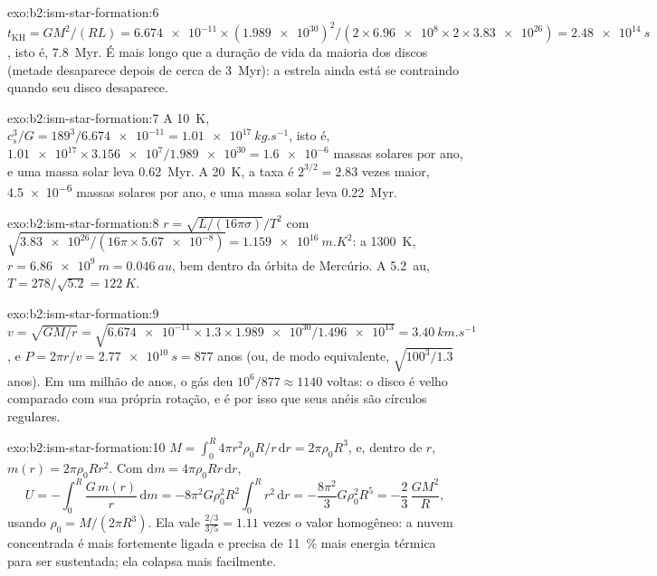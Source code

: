 \begin{solution}{exo:b2:ism-star-formation:6}
$t_{\mathrm{KH}} = GM^2/(RL) = \num{6.674e-11}\times(\num{1.989e30})^2/(2\times
\num{6.96e8}\times2\times\num{3.83e26}) = \qty{2.48e14}{s}$, isto é,
\qty{7.8}{Myr}. É mais longo que a duração de vida da maioria dos discos (metade desaparece depois de
cerca de \qty{3}{Myr}): a estrela ainda está se contraindo quando seu disco desaparece.
\end{solution}

\begin{solution}{exo:b2:ism-star-formation:7}
A \qty{10}{K}, $c_s^3/G = 189^3/\num{6.674e-11} = \qty{1.01e17}{kg.s^{-1}}$, isto é,
$\num{1.01e17}\times\num{3.156e7}/\num{1.989e30} = \num{1.6e-6}$ massas solares por
ano, e uma massa solar leva \qty{0.62}{Myr}. A \qty{20}{K}, a taxa é
$2^{3/2} = 2.83$ vezes maior, \num{4.5e-6} massas solares por ano, e uma massa
solar leva \qty{0.22}{Myr}.
\end{solution}

\begin{solution}{exo:b2:ism-star-formation:8}
$r = \sqrt{L/(16\pi\sigma)}/T^2$ com $\sqrt{\num{3.83e26}/(16\pi\times\num{5.67e-8})}
= \qty{1.159e16}{m.K^2}$: a \qty{1300}{K}, $r = \qty{6.86e9}{m} = \qty{0.046}{au}$,
bem dentro da órbita de Mercúrio. A \qty{5.2}{au}, $T = 278/\sqrt{5.2} = \qty{122}{K}$.
\end{solution}

\begin{solution}{exo:b2:ism-star-formation:9}
$v = \sqrt{GM/r} = \sqrt{\num{6.674e-11}\times1.3\times\num{1.989e30}/\num{1.496e13}}
= \qty{3.40}{km.s^{-1}}$, e $P = 2\pi r/v = \qty{2.77e10}{s} = 877$ anos
(ou, de modo equivalente, $\sqrt{100^3/1.3}$ anos). Em um milhão de anos, o gás deu
$10^6/877 \approx \num{1140}$ voltas: o disco é velho comparado com sua própria rotação,
e é por isso que seus anéis são círculos regulares.
\end{solution}

\begin{solution}{exo:b2:ism-star-formation:10}
$M = \int_0^R 4\pi r^2\rho_0R/r\,\mathrm dr = 2\pi\rho_0R^3$, e, dentro de $r$,
$m(r) = 2\pi\rho_0Rr^2$. Com $\mathrm dm = 4\pi\rho_0Rr\,\mathrm dr$,
\[
  U = -\int_0^R \frac{G\,m(r)}{r}\,\mathrm dm
    = -8\pi^2G\rho_0^2R^2\int_0^R r^2\,\mathrm dr = -\frac{8\pi^2}{3}G\rho_0^2R^5
    = -\frac23\,\frac{GM^2}{R},
\]
usando $\rho_0 = M/(2\pi R^3)$. Ela vale $\tfrac{2/3}{3/5} = 1.11$ vezes o valor homogêneo:
a nuvem concentrada é mais fortemente ligada e precisa de \qty{11}{\percent} mais
energia térmica para ser sustentada; ela colapsa mais facilmente.
\end{solution}

